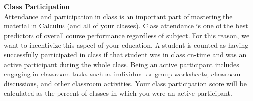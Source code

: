 \documentclass[12pt]{article}
\renewcommand{\emph}[1]{\textsf{\textbf{#1}}}
\newcommand{\localhead}[1]{\par\smallskip\textbf{#1}\nobreak\\}%
\def\heading#1{\localhead{\large\emph{#1}}}
\newenvironment{clist}%
{\bgroup\parskip 0pt\begin{list}{$\bullet$}{\partopsep 4pt\topsep 0pt\itemsep -2pt}}%
{\end{list}\egroup}%
\begin{document}
%

\heading{Class Participation}
Attendance and participation in class is an important part of mastering the material in Calculus (and all of your classes). Class attendance is one of the best predictors of overall course performance regardless of subject. For this reason, we want to incentivize this aspect of your education. A student is counted as having successfully participated in class if that student was in class on-time and was an active participant during the whole class. Being an active participant includes engaging in classroom tasks such as individual or group worksheets, classroom discussions, and other classroom activities. Your class participation score will be calculated as the percent of classes in which you were an active participant. 
\end{document}
